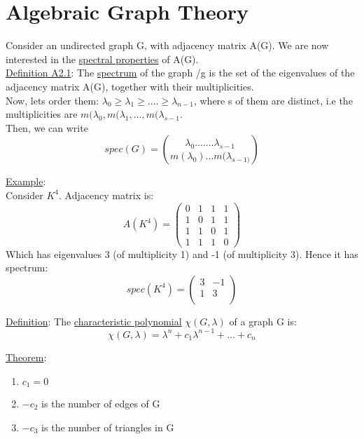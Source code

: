 \documentclass[11pt]{book}
\begin{document}
\section{Algebraic Graph Theory}

Consider an undirected graph G, with adjacency matrix A(G). We are now interested in the \underline{spectral properties} of A(G).\\

\underline{Definition A2.1}: The \underline{spectrum} of the graph /g is the set of the eigenvalues of the adjacency matrix A(G), together with their multiplicities.\\

Now, lets order them: $\lambda_{0} \geq \lambda_{1} \geq ....\geq \lambda_{n-1}$, where s of them are distinct, i.e the multiplicities are $m(\lambda_{0},m(\lambda_{1},...,m(\lambda_{s-1}$.\\
Then, we can write $$spec(G) = \binom{\lambda_{0}.......\lambda_{s-1}}{m(\lambda_{0})...m(\lambda_{s-1)}}$$

\underline{Example}:\\
Consider $K^{4}$. Adjacency matrix is: $$A(K^{4}) = \begin{pmatrix}
  0 & 1 & 1 & 1 \\
  1 & 0 & 1 & 1 \\
  1 & 1 & 0 & 1 \\
  1 & 1 & 1 & 0
 \end{pmatrix}$$
 Which has eigenvalues 3 (of multiplicity 1) and -1 (of multiplicity 3). Hence it has spectrum: $$spec(K^{4}) = \begin{pmatrix}
 3 & -1 \\
 1 & 3 \\
 \end{pmatrix}$$
 
\underline{Definition}: The \underline{characteristic polynomial} $\chi(G,\lambda)$ of a graph G is: $$\chi(G,\lambda) = \lambda^{n} + c_{1}\lambda^{n-1} + ... + c_{n}$$
 
\underline{Theorem}:\begin{enumerate}
\item $c_{1} = 0$
\item $-c_{2}$ is the number of edges of G
\item $-c_{3}$ is the number of triangles in G
\end{enumerate}
\end{document}
